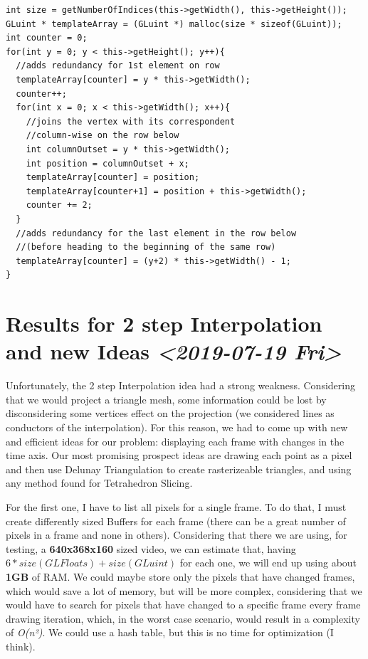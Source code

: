 \documentclass[11pt]{article}
\begin{document}
\begin{verbatim}
int size = getNumberOfIndices(this->getWidth(), this->getHeight());
GLuint * templateArray = (GLuint *) malloc(size * sizeof(GLuint));
int counter = 0;
for(int y = 0; y < this->getHeight(); y++){
  //adds redundancy for 1st element on row
  templateArray[counter] = y * this->getWidth();
  counter++;
  for(int x = 0; x < this->getWidth(); x++){
    //joins the vertex with its correspondent
    //column-wise on the row below
    int columnOutset = y * this->getWidth();
    int position = columnOutset + x;
    templateArray[counter] = position;
    templateArray[counter+1] = position + this->getWidth();
    counter += 2;
  }
  //adds redundancy for the last element in the row below
  //(before heading to the beginning of the same row)
  templateArray[counter] = (y+2) * this->getWidth() - 1;
}
\end{verbatim}

\section*{Results for 2 step Interpolation and new Ideas \textit{<2019-07-19 Fri>}}
\label{sec:orgefabf53}

Unfortunately, the 2 step Interpolation idea had a strong weakness. Considering that we would project a triangle mesh, some information could be lost by disconsidering some vertices effect on the projection (we considered lines as conductors of the interpolation). For this reason, we had to come up with new and efficient ideas for our problem: displaying each frame with changes in the time axis. Our most promising prospect ideas are drawing each point as a pixel and then use Delunay Triangulation to create rasterizeable triangles, and using any method found for Tetrahedron Slicing.

For the first one, I have to list all pixels for a single frame. To do that, I must create differently sized Buffers for each frame (there can be a great number of pixels in a frame and none in others). Considering that there we are using, for testing, a \textbf{640x368x160} sized video, we can estimate that, having \(6 * size(GLFloats) + size(GLuint)\) for each one, we will end up using about \textbf{1GB} of RAM. We could maybe store only the pixels that have changed frames, which would save a lot of memory, but will be more complex, considering that we would have to search for pixels that have changed to a specific frame every frame drawing iteration, which, in the worst case scenario, would result in a complexity of \emph{O(n²)}. We could use a hash table, but this is no time for optimization (I think).
\end{document}
